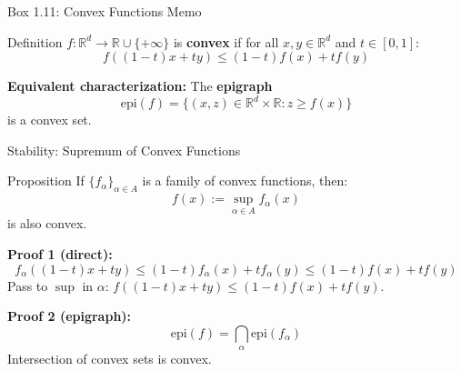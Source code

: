 \documentclass[aspectratio=169]{beamer}
\newcommand{\R}{\mathbb{R}}
\begin{document}
\begin{frame}{Box 1.11: Convex Functions Memo}
\begin{block}{Definition}
$f : \R^d \to \R \cup \{+\infty\}$ is \textbf{convex} if for all $x, y \in \R^d$ and $t \in [0,1]$:
\[
f((1-t)x + ty) \leq (1-t)f(x) + tf(y)
\]
\end{block}

\vspace{0.3cm}
\textbf{Equivalent characterization:} The \textbf{epigraph}
\[
\text{epi}(f) = \{(x, z) \in \R^d \times \R : z \geq f(x)\}
\]
is a convex set.

\begin{center}
\end{center}
\end{frame}

\begin{frame}{Stability: Supremum of Convex Functions}
\begin{block}{Proposition}
If $\{f_\alpha\}_{\alpha \in A}$ is a family of convex functions, then:
\[
f(x) := \sup_{\alpha \in A} f_\alpha(x)
\]
is also convex.
\end{block}

\vspace{0.3cm}
\textbf{Proof 1 (direct):}
\[
f_\alpha((1-t)x + ty) \leq (1-t)f_\alpha(x) + tf_\alpha(y) \leq (1-t)f(x) + tf(y)
\]
Pass to $\sup$ in $\alpha$: $f((1-t)x + ty) \leq (1-t)f(x) + tf(y)$. \checkmark

\vspace{0.3cm}
\textbf{Proof 2 (epigraph):}
\[
\text{epi}(f) = \bigcap_{\alpha} \text{epi}(f_\alpha)
\]
Intersection of convex sets is convex. \checkmark
\end{frame}
\end{document}
